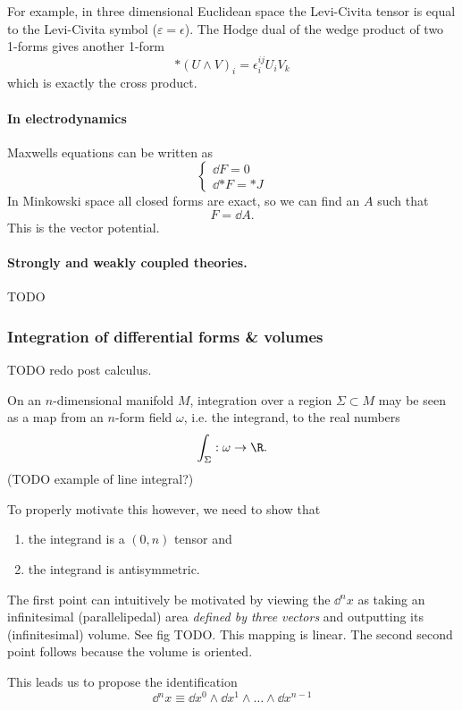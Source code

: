 For example, in three dimensional Euclidean space the Levi-Civita tensor is equal to the Levi-Civita symbol ($\varepsilon = \epsilon$). The Hodge dual of the wedge product of two 1-forms gives another 1-form
\[ *(U\wedge V)_i = \epsilon_i^{ij}U_iV_k \]
which is exactly the cross product.

\paragraph{In electrodynamics} Maxwells equations can be written as
\[ \begin{cases}
\dd{F} = 0 \\ \dd{*F} = *J
\end{cases} \]
In Minkowski space all closed forms are exact, so we can find an $A$ such that
\[ F = \dd{A}. \]
This is the vector potential.
\paragraph{Strongly and weakly coupled theories.} TODO


\subsubsection{Integration of differential forms \& volumes}
TODO redo post calculus.

On an $n$-dimensional manifold $M$, integration over a region $\Sigma \subset M$ may be seen as a map from an $n$-form field $\omega$, i.e. the integrand, to the real numbers
\[ \int_\Sigma: \omega \to \R. \]
(TODO example of line integral?)

To properly motivate this however, we need to show that
\begin{enumerate}
\item the integrand is a $(0,n)$ tensor and
\item the integrand is antisymmetric.
\end{enumerate}
The first point can intuitively be motivated by viewing the $\dd{^nx}$ as taking an infinitesimal (parallelipedal) area \textit{defined by three vectors} and outputting its (infinitesimal) volume. See fig TODO. This mapping is linear.
The second second point follows because the volume is oriented.

This leads us to propose the identification
\begin{equation}
\dd{^nx} \equiv \dd{x^0}\wedge \dd{x^1}\wedge \ldots \wedge \dd{x^{n-1}} \label{eq:diffTransfRule}
\end{equation}



